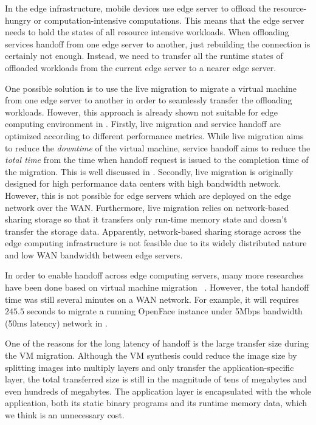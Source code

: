 %
In the edge infrastructure, mobile devices use edge server to offload the resource-hungry or computation-intensive computations. This means that the edge server needs to hold the states of all resource intensive workloads. 
When offloading services handoff from one edge server to another, just rebuilding the connection is certainly not enough. Instead, we need to transfer all the runtime states of offloaded workloads from the current edge server to a nearer edge server.  

One possible solution is 
to use the live migration\cite{vmlivemig} 
to migrate a virtual machine from one edge server to another in order to seamlessly transfer the offloading workloads. However, this approach is already shown not suitable for edge computing environment in  \cite{ha2015vmhandoff}. Firstly, live migration and service handoff are optimized according to different performance metrics. While live migration aims to reduce the \textit{downtime} of the virtual machine, service handoff aims to reduce the \textit{total time} from the time when handoff request is issued to the completion time of the migration. This is well discussed in \cite{ha2015vmhandoff}.
Secondly, live migration is originally designed for high performance data centers with high bandwidth network. However, this is not possible for edge servers which are deployed on the edge network over the WAN. Furthermore, live migration relies on network-based sharing storage so that it transfers only run-time memory state and doesn't transfer the storage data. Apparently, network-based sharing storage across the edge computing infrastructure is not feasible due to its widely distributed nature and low WAN bandwidth between edge servers. 

In order to enable handoff across edge computing servers, many more researches have been done based on virtual machine migration ~\cite{satya2009case,ha2015vmhandoff}. 
However, the total handoff time was still several minutes on a WAN network. For example, it will requires $245.5$ seconds to migrate a running OpenFace instance under 5Mbps bandwidth (50ms latency) network in \cite{ha2015vmhandoff}. 

One of the reasons for the long latency of handoff is the large transfer size during the VM migration. Although the VM synthesis could reduce the image size by splitting images into multiply layers and only transfer the application-specific layer, the total transferred size is still in the magnitude of tens of megabytes and even hundreds of megabytes. 
The application layer is encapsulated with the whole application, both its static binary programs and its runtime memory data, which we think is an unnecessary cost. 

